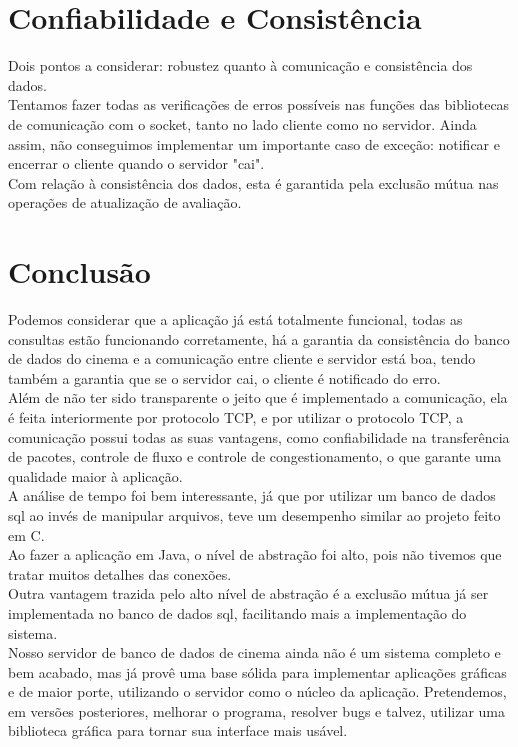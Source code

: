 \documentclass[11pt,twoside]{article}
\begin{document}
\section{Confiabilidade e Consistência}
Dois pontos a considerar: robustez quanto à comunicação e consistência dos dados.\\
Tentamos fazer todas as verificações de erros possíveis nas funções das bibliotecas de comunicação com o socket, tanto no lado cliente como no servidor. Ainda assim, não conseguimos implementar um importante caso de exceção: notificar e encerrar o cliente quando o servidor "cai".\\
Com relação à consistência dos dados, esta é garantida pela exclusão mútua nas operações de atualização de avaliação.\\

\section{Conclusão}
Podemos considerar que a aplicação já está totalmente funcional, todas as consultas estão funcionando corretamente, há a garantia da consistência do banco de dados do cinema e a comunicação entre cliente e servidor está boa, tendo também a garantia que se o servidor cai, o cliente é notificado do erro.\\
Além de não ter sido transparente o jeito que é implementado a comunicação, ela é feita interiormente por protocolo TCP, e por utilizar o protocolo TCP, a comunicação possui todas as suas vantagens, como confiabilidade na transferência de pacotes, controle de fluxo e controle de congestionamento, o que garante uma qualidade maior à aplicação.\\
A análise de tempo foi bem interessante, já que por utilizar um banco de dados sql ao invés de manipular arquivos, teve um desempenho similar ao projeto feito em C.\\
Ao fazer a aplicação em Java, o nível de abstração foi alto, pois não tivemos que tratar muitos detalhes das conexões.\\
Outra vantagem trazida pelo alto nível de abstração é a exclusão mútua já ser implementada no banco de dados sql, facilitando mais a implementação do sistema.\\
Nosso servidor de banco de dados de cinema ainda não é um sistema completo e bem acabado, mas já provê uma base sólida para implementar aplicações gráficas e de maior porte, utilizando o servidor como o núcleo da aplicação. Pretendemos, em versões posteriores, melhorar o programa, resolver bugs e talvez, utilizar uma biblioteca gráfica para tornar sua interface mais usável.\\
\end{document}
